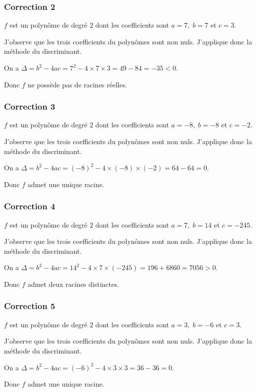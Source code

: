 \documentclass[15pt, mathserif]{beamer}
\begin{document}
\begin{frame}
\vspace{-10mm}
	\frametitle{Correction 2}
$f$ est un polynôme de degré $2$ dont les coefficients sont $a =7, \; b =7$ et $c =3$.
 
J'observe que les trois coefficients du polynômes sont non nuls. J'applique donc la méthode du discriminant. 
 
On a $\Delta = b^2-4ac =7^2-4 \times7\times3=49-84 = -35<0$.

Donc $f$ ne possède pas de racines réelles.\end{frame}


\begin{frame}
\vspace{-10mm}
	\frametitle{Correction 3}
$f$ est un polynôme de degré $2$ dont les coefficients sont $a =-8, \; b =-8$ et $c =-2$.
 
J'observe que les trois coefficients du polynômes sont non nuls. J'applique donc la méthode du discriminant. 
 
On a $\Delta = b^2-4ac =(-8)^2-4 \times\left(-8\right)\times\left(-2\right)=64-64 = 0$.

Donc $f$ admet une unique racine.\end{frame}


\begin{frame}
\vspace{-10mm}
	\frametitle{Correction 4}
$f$ est un polynôme de degré $2$ dont les coefficients sont $a =7, \; b =14$ et $c =-245$.
 
J'observe que les trois coefficients du polynômes sont non nuls. J'applique donc la méthode du discriminant. 
 
On a $\Delta = b^2-4ac =14^2-4 \times7\times\left(-245\right)=196+6860 = 7056>0$.

Donc $f$ admet deux racines distinctes.\end{frame}


\begin{frame}
\vspace{-10mm}
	\frametitle{Correction 5}
$f$ est un polynôme de degré $2$ dont les coefficients sont $a =3, \; b =-6$ et $c =3$.
 
J'observe que les trois coefficients du polynômes sont non nuls. J'applique donc la méthode du discriminant. 
 
On a $\Delta = b^2-4ac =(-6)^2-4 \times3\times3=36-36 = 0$.

Donc $f$ admet une unique racine.\end{frame}
\end{document}
